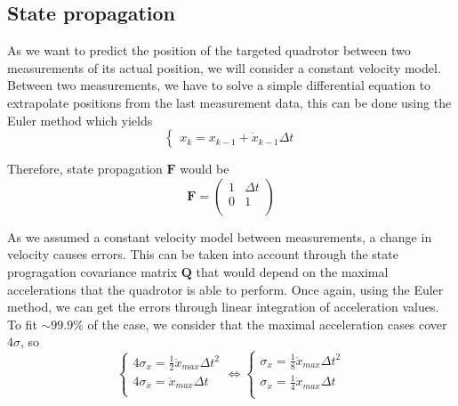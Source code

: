 \documentclass[12pt]{article}
\begin{document}
\subsection{State propagation}
As we want to predict the position of the targeted quadrotor between two measurements of its actual position, we will consider a constant velocity model.
Between two measurements, we have to solve a simple differential equation to extrapolate positions from the last measurement data, this can be done using the Euler method which yields
\begin{equation}
\left\{
    \begin{array}{l}
    x_k = x_{k-1} + \dot{x}_{k-1}\Delta{t}
    \end{array}
\right.
\end{equation}

Therefore, state propagation $\mathbf{F}$ would be
\begin{equation}
\mathbf{F} =
    \begin{pmatrix}
        1 & \Delta{t} \\
        0 & 1 \\
    \end{pmatrix}
\end{equation}

As we assumed a constant velocity model between measurements, a change in velocity causes errors.
This can be taken into account through the state progragation covariance matrix $\mathbf{Q}$ that would depend on the maximal accelerations that the quadrotor is able to perform.
Once again, using the Euler method, we can get the errors through linear integration of acceleration values.
To fit $\sim 99.9\%$ of the case, we consider that the maximal acceleration cases cover $4\sigma$, so
\begin{equation}
\left\{
    \begin{array}{l}
    4 \sigma_x = \frac{1}{2} \ddot{x}_{max} \Delta{t}^2 \\
    4 \sigma_{\dot{x}} = \ddot{x}_{max} \Delta{t} \\
    \end{array}
\right.
\Leftrightarrow
\left\{
    \begin{array}{l}
    \sigma_x = \frac{1}{8} \ddot{x}_{max} \Delta{t}^2 \\
    \sigma_{\dot{x}} = \frac{1}{4} \ddot{x}_{max} \Delta{t} \\
    \end{array}
\right.
\end{equation}
\end{document}
